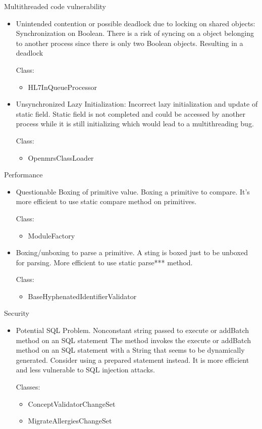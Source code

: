 \documentclass{report} %
\begin{document}
Multithreaded code vulnerability
  \begin{itemize}
    \item Unintended contention or possible deadlock due to locking on shared
      objects: 
      Synchronization on Boolean. There is a risk of syncing on a object
      belonging to another process since there is only two Boolean objects.
      Resulting in a deadlock

      Class:

      \begin{itemize}
        \item HL7InQueueProcessor
      \end{itemize}
    \item Unsynchronized Lazy Initialization: 
      Incorrect lazy initialization and update of static field. Static field
      is not completed and could be accessed by another process while it is
      still initializing which would lead to a multithreading bug.

      Class:
      \begin{itemize}
          \item OpenmrsClassLoader
      \end{itemize}
  \end{itemize}
Performance
  \begin{itemize}
    \item Questionable Boxing of primitive value. 
      Boxing a primitive to compare. It's more efficient to use static compare
      method on primitives.

      Class:
      \begin{itemize}
          \item ModuleFactory
      \end{itemize}
    \item Boxing/unboxing to parse a primitive. 
      A sting is boxed just to be unboxed for parsing. More
      efficient to use static parse*** method.

      Class:
      \begin{itemize}
        \item BaseHyphenatedIdentifierValidator
      \end{itemize}
  \end{itemize}
Security
  \begin{itemize}
    \item Potential SQL Problem. 
      Nonconstant string passed to execute or addBatch method on an SQL
      statement The method invokes the execute or addBatch method on an SQL
      statement with a String that seems to be dynamically generated.
      Consider using a prepared statement instead. It is more efficient
      and less vulnerable to SQL injection attacks. 

      Classes:
      \begin{itemize}
        \item ConceptValidatorChangeSet
        \item MigrateAllergiesChangeSet
      \end{itemize}
  \end{itemize}
\end{document}
